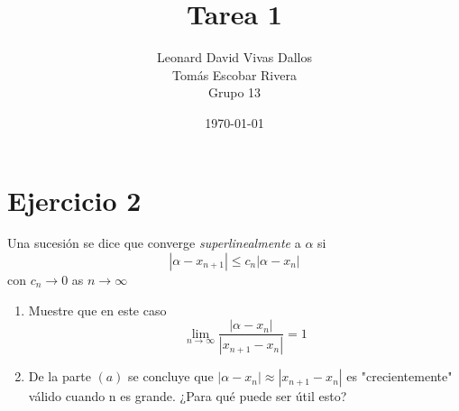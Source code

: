\documentclass[12pt]{article}
\title{Tarea 1}
\author{Leonard David Vivas Dallos \\ Tomás Escobar Rivera \\ Grupo 13}
\date{\today}
\begin{document}
\maketitle

\tableofcontents

\section{Ejercicio 2}
Una sucesión se dice que converge \textit{superlinealmente} a $\alpha$ si
\begin{equation*}
    | \alpha - x_{n+1} | \leq c_n | \alpha - x_n |
\end{equation*}
con $c_n \rightarrow{} 0$ as $n \rightarrow \infty$

\begin{enumerate}[label=\alph*)]
    \item Muestre que en este caso
        \begin{equation*}
            \lim_{n \to \infty} \frac{|\alpha-x_n|}{|x_{n+1}-x_n|}=1
        \end{equation*}
    \item De la parte $(a)$ se concluye que $|\alpha-x_n|\approx|x_{n+1}-x_n|$ es "crecientemente" válido cuando n es grande. ¿Para qué puede ser útil esto?
\end{enumerate}

\renewcommand{\thesubsection}{\thesection.\alph{subsection}}
\end{document}
